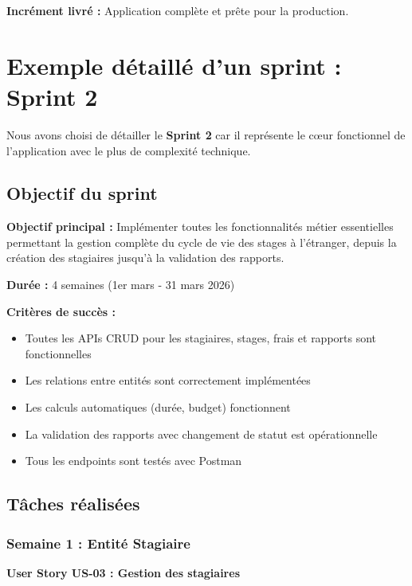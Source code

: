 \documentclass[12pt,a4paper]{report}
\begin{document}
\textbf{Incrément livré :} Application complète et prête pour la production.

\section{Exemple détaillé d'un sprint : Sprint 2}

Nous avons choisi de détailler le \textbf{Sprint 2} car il représente le cœur fonctionnel de l'application avec le plus de complexité technique.

\subsection{Objectif du sprint}

\textbf{Objectif principal :} Implémenter toutes les fonctionnalités métier essentielles permettant la gestion complète du cycle de vie des stages à l'étranger, depuis la création des stagiaires jusqu'à la validation des rapports.

\textbf{Durée :} 4 semaines (1er mars - 31 mars 2026)

\textbf{Critères de succès :}
\begin{itemize}[leftmargin=1cm]
    \item Toutes les APIs CRUD pour les stagiaires, stages, frais et rapports sont fonctionnelles
    \item Les relations entre entités sont correctement implémentées
    \item Les calculs automatiques (durée, budget) fonctionnent
    \item La validation des rapports avec changement de statut est opérationnelle
    \item Tous les endpoints sont testés avec Postman
\end{itemize}

\subsection{Tâches réalisées}

\subsubsection{Semaine 1 : Entité Stagiaire}

\textbf{User Story US-03 : Gestion des stagiaires}
\end{document}
